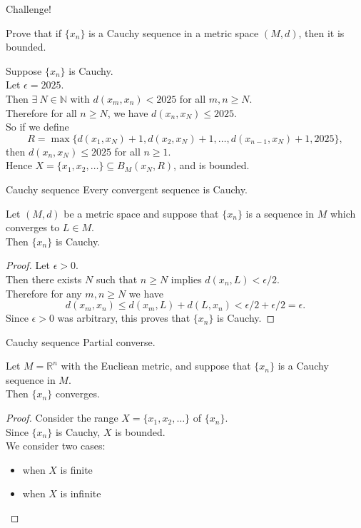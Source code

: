 \documentclass{beamer}
\begin{document}
\begin{frame}{Challenge!}
\begin{prob}
Prove that if $\{x_n\}$ is a Cauchy sequence in a metric space $(M,d)$, then it is bounded.
\end{prob}
\pause
\begin{soln}
\pause
Suppose $\{x_n\}$ is Cauchy.\\
\pause
Let $\epsilon = 2025$.\\
\pause
Then $\exists\ N\in\mathbb N$ with $d(x_m,x_n) < 2025$ for all $m,n\geq N$.\\
\pause
Therefore for all $n\geq N$, we have $d(x_n,x_N)\leq 2025$.\\
\pause
So if we define
$$R = \max\{d(x_1,x_N)+1, d(x_2,x_N)+1,\dots, d(x_{n-1},x_N)+1,2025\},$$
\pause
then $d(x_n,x_N)\leq 2025$ for all $n\geq 1$.\\
\pause
Hence $X = \{x_1,x_2,\dots\}\subseteq B_M(x_N,R)$, and is bounded.
\end{soln}
\end{frame}

\begin{frame}{Cauchy sequence}
Every convergent sequence is Cauchy.
\pause
\begin{thm}
Let $(M,d)$ be a metric space and suppose that $\{x_n\}$ is a sequence in $M$ which converges to $L\in M$.\\
Then $\{x_n\}$ is Cauchy.
\end{thm}
\pause
\begin{proof}
\pause
Let $\epsilon > 0$.\\
\pause
Then there exists $N$ such that $n\geq N$ implies $d(x_n,L) < \epsilon/2$.\\
\pause
Therefore for any $m,n\geq N$ we have
$$d(x_m,x_n)\leq d(x_m,L) + d(L,x_n) < \epsilon/2 + \epsilon/2 = \epsilon.$$
Since $\epsilon > 0$ was arbitrary, this proves that $\{x_n\}$ is Cauchy.
\end{proof}
\end{frame}

\begin{frame}{Cauchy sequence}
Partial converse.
\pause
\begin{thm}
Let $M=\mathbb R^n$ with the Eucliean metric, and suppose that $\{x_n\}$ is a Cauchy sequence in $M$.\\
Then $\{x_n\}$ converges.
\end{thm}
\pause
\begin{proof}
\pause
Consider the range $X = \{x_1,x_2,\dots\}$ of $\{x_n\}$.\\
\pause
Since $\{x_n\}$ is Cauchy, $X$ is bounded.\\
\pause
We consider two cases:
\begin{itemize}
\pause
\item when $X$ is finite
\pause
\item when $X$ is infinite
\end{itemize}
\end{proof}
\end{frame}
\end{document}
